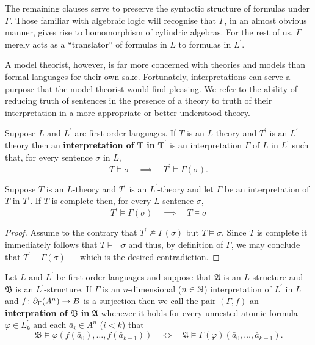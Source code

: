 The remaining clauses serve to preserve the syntactic structure of formulas
under $\Gamma$.  Those familiar with algebraic logic will recognise that
$\Gamma$, in an almost obvious manner, gives rise to homomorphism of cylindric
algebras.  For the rest of us, $\Gamma$ merely acts as a ``translator'' of
formulas in $L$ to formulas in $L^\prime$.

A model theorist, however, is far more concerned with theories and models than formal languages for their own sake.  Fortunately, interpretations can serve a purpose that the model theorist would find pleasing.  We refer to the ability of reducing truth of sentences in the presence of a theory to truth of their interpretation in a more appropriate or better understood theory.

\begin{dfn}
	Suppose $L$ and $L^\prime$ are first-order languages.  If $T$ is an $L$-theory and $T^\prime$ is an $L^\prime$-theory then an \textbf{interpretation of }$\bm{T}$\textbf{ in }$\bm{T^\prime}$ is an interpretation $\Gamma$ of $L$ in $L^\prime$ such that, for every sentence $\sigma$ in $L$,
	\begin{equation}
		T\models\sigma\quad\implies\quad T^\prime\models\Gamma(\sigma).
	\end{equation}
\end{dfn}

\begin{prp}
	Suppose $T$ is an $L$-theory and $T^\prime$ is an $L^\prime$-theory and let $\Gamma$ be an interpretation of $T$ in $T^\prime$.  If $T$ is complete then, for every $L$-sentence $\sigma$,
	\begin{equation}
		T^\prime\models\Gamma(\sigma)\quad\implies\quad T\models\sigma
	\end{equation}
\end{prp}
\begin{proof}
	Assume to the contrary that $T^\prime\not\models\Gamma(\sigma)$ but $T\models\sigma$.  Since $T$ is complete it immediately follows that $T\models\neg\sigma$ and thus, by definition of $\Gamma$, we may conclude that $T^\prime\models\Gamma(\sigma)$ --- which is the desired contradiction.
\end{proof}

\begin{dfn}
	Let $L$ and $L^\prime$ be first-order languages and suppose that $\mathfrak{A}$ is an $L$-structure and $\mathfrak{B}$ is an $L^\prime$-structure.  If $\Gamma$ is an $n$-dimensional ($n\in\mathbb{N}$) interpretation of $L^\prime$ in $L$ and $f\colon\partial_\Gamma(A^n)\to B$ is a surjection then we call the pair $(\Gamma,f)$ an \textbf{interpration of }$\bm{\mathfrak{B}}$\textbf{ in }$\bm{\mathfrak{A}}$ whenever it holds for every unnested atomic formula $\varphi\in L^\prime_k$ and each $\bar{a}_i\in A^n$ ($i<k$) that
	\begin{equation}
		\mathfrak{B}\models\varphi(f(\bar{a}_0),\dotsc,f(\bar{a}_{k-1}))\quad\iff\quad\mathfrak{A}\models\Gamma(\varphi)(\bar{a}_0,\dotsc,\bar{a}_{k-1}).
	\end{equation}
\end{dfn}

